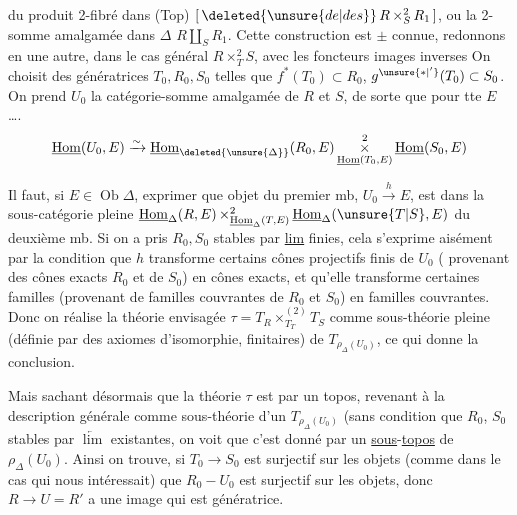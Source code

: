 
du produit 2-fibré dans (Top) $[\,\deleted{\unsure{de|des}}\,R\mathop{\times}^{2}_{S}R_1\,]$, ou la 2-somme amalgamée dans $\Delta$ \quad $R\amalg_S R_1$. Cette construction est $\pm$ connue, redonnons en une autre, dans le cas général $R\mathop{\times}^{2}_{T}S$, avec les foncteurs images inverses
On choisit des   génératrices $T_0,R_0,S_0$ telles que $f^*(T_0)\subset R_0$, $g^{\unsure{*|'}}(T_0)\subset S_0$. On prend $U_0$ la catégorie-somme amalgamée de $R$ et $S$, de sorte que pour tte  $E$  \ldots .
\[
 \underline{\mathrm{Hom}}(U_0,E)\xrightarrow{\sim}
 \underline{\mathrm{Hom}}_{\deleted{\unsure{\Delta}}}(R_0,E)
 \mathop{\times}^{2}_{\underline{\mathrm{Hom}}(T_0,E)}
 \underline{\mathrm{Hom}}(S_0,E)
\]

Il faut, si $E\in\operatorname{Ob}\Delta$, exprimer que  objet du  premier mb, $U_0\xrightarrow{h}E$, est dans  la sous-catégorie pleine $\underline{\mathrm{Hom}}_\Delta(R,E)\mathop{\times}^{2}_{\underline{\mathrm{Hom}}_\Delta(T,E)}\underline{\mathrm{Hom}}_\Delta(\unsure{T|S},E)$ du deuxième mb. Si on a pris $R_0,S_0$ stables par \uline{lim} finies, cela s'exprime aisément par la  condition que $h$ transforme certains cônes projectifs finis de $U_0$ ( provenant des cônes exacts  $R_0$ et de $S_0$) en cônes exacts,
et  qu'elle transforme certaines familles (provenant de familles couvrantes de $R_0$ et $S_0$) en familles couvrantes. Donc on réalise la théorie envisagée $\tau=T_R\mathop{\times}^{(2)}_{T_T}T_S$ comme sous-théorie pleine (définie par des axiomes d'isomorphie, finitaires) de $T_{\rho_\Delta(U_0)}$, ce qui donne la conclusion.

Mais sachant désormais que  la théorie $\tau$ est  par un topos,  revenant à la description générale comme sous-théorie d'un $T_{\rho_\Delta(U_0)}$ (sans  condition que $R_0$, $S_0$ stables par $\underleftarrow{\lim}$ existantes, on voit que c'est donné par un \uline{sous}-\uline{topos} de $\rho_\Delta(U_0)$. Ainsi on trouve, si $T_0\to S_0$ est surjectif sur les objets (comme dans le cas qui nous intéressait) que $R_0-U_0$ est surjectif sur les objets, donc $R\to U=R'$  a une image qui est génératrice.
